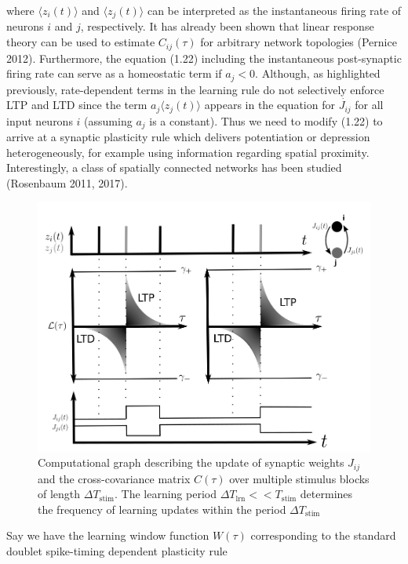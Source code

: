 \documentclass{ucetd}
\begin{document}
where $\langle z_{i}(t)\rangle$ and $\langle z_{j}(t)\rangle$ can be interpreted as the instantaneous firing rate of neurons $i$ and $j$, respectively. It has already been shown that linear response theory can be used to estimate $C_{ij}(\tau)$ for arbitrary network topologies (Pernice 2012). Furthermore, the equation (1.22) including the instantaneous post-synaptic firing rate can serve as a homeostatic term if $a_{j} < 0$. Although, as highlighted previously, rate-dependent terms in the learning rule do not selectively enforce LTP and LTD since the term $a_{j}\langle z_{j}(t)\rangle$ appears in the equation for $\dot{J_{ij}}$ for all input neurons $i$ (assuming $a_{j}$ is a constant). Thus we need to modify (1.22) to arrive at a synaptic plasticity rule which delivers potentiation or depression heterogeneously, for example using information regarding spatial proximity. Interestingly, a class of spatially connected networks has been studied (Rosenbaum 2011, 2017).



\begin{figure}[t!]
\centering
\includegraphics[width=150mm]{figure-2}
\caption{Computational graph describing the update of synaptic weights $J_{ij}$ and the cross-covariance matrix $C(\tau)$ over multiple stimulus blocks of length $\Delta T_{\mathrm{stim}}$. The learning period $\Delta T_{\mathrm{lrn}}<< T_{\mathrm{stim}}$ determines the frequency of learning updates within the period $\Delta T_{\mathrm{stim}}$}
\end{figure}

Say we have the learning window function $W(\tau)$ corresponding to the standard doublet spike-timing dependent plasticity rule
\end{document}

